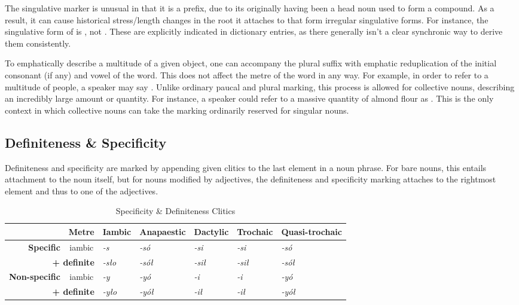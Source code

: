 The singulative marker is unusual in that it is a prefix, due to its originally having been a head noun used to form a compound. As a result, it can cause historical stress/length changes in the root it attaches to that form irregular singulative forms. For instance, the singulative form of  is , not . These are explicitly indicated in dictionary entries, as there generally isn't a clear synchronic way to derive them consistently.

To emphatically describe a multitude of a given object, one can accompany the plural suffix with emphatic reduplication of the initial consonant (if any) and vowel of the word. This does not affect the metre of the word in any way. For example, in order to refer to a multitude of people, a speaker may say . Unlike ordinary paucal and plural marking, this process is allowed for collective nouns, describing an incredibly large amount or quantity. For instance, a speaker could refer to a massive quantity of almond flour as . This is the only context in which collective nouns can take the marking ordinarily reserved for singular nouns.

\subsection{Definiteness \& Specificity}

Definiteness and specificity are marked by appending given clitics to the last element in a noun phrase. For bare nouns, this entails attachment to the noun itself, but for nouns modified by adjectives, the definiteness and specificity marking attaches to the rightmost element and thus to one of the adjectives. 

\begin{table}[htb]
    \centering
    \begin{tabular}{@{}rclllll@{}}
    \toprule
    \textit{\textbf{}} & \textbf{Metre} & \multicolumn{1}{c}{\textbf{Iambic}} & \multicolumn{1}{c}{\textbf{Anapaestic}} & \multicolumn{1}{c}{\textbf{Dactylic}} & \multicolumn{1}{c}{\textbf{Trochaic}} & \multicolumn{1}{c}{\textbf{Quasi-trochaic}} \\ \midrule
    \textbf{Specific} & iambic & \textit{-s\supho{}} & \textit{-só} & \textit{-si\supho{}} & \textit{-si\supho{}} & \textit{-só} \\
    \multicolumn{2}{r}{\textbf{+ definite}} & \textit{-sło} & \textit{-sół} & \textit{-sił} & \textit{-sił} & \textit{-sół} \\
    \textbf{Non-specific} & iambic & \textit{-\suph{}y\supho{}} & \textit{-\suph{}yó} & \textit{-\suph{}i\supho{}} & \textit{-\suph{}i\supho{}} & \textit{-\suph{}yó} \\
    \multicolumn{2}{r}{\textbf{+ definite}} & \textit{-\suph{}yło} & \textit{-\suph{}yół} & \textit{-\suph{}ił} & \textit{-\suph{}ił} & \textit{-\suph{}yół} \\ \bottomrule
    \end{tabular}
    \caption{Specificity \& Definiteness Clitics}
    \label{tab:spec-def}
\end{table}

